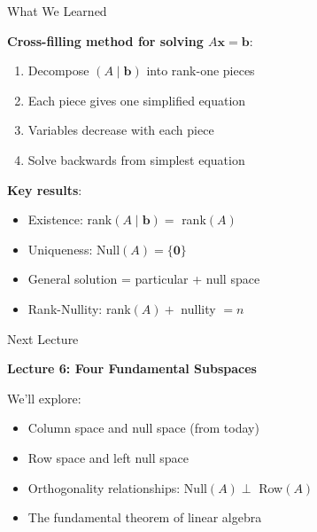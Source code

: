 \documentclass[10pt]{beamer}
\theoremstyle{definition}
\newcommand{\x}[1]{\alert{\textbf{#1}}}
\begin{document}
\begin{frame}{What We Learned}

\x{Cross-filling method for solving $A\mathbf{x} = \mathbf{b}$}:
\begin{enumerate}
\item Decompose $(A \mid \mathbf{b})$ into rank-one pieces
\item Each piece gives one simplified equation
\item Variables decrease with each piece
\item Solve backwards from simplest equation
\end{enumerate}

\vspace{1em}

\x{Key results}:
\begin{itemize}
\item Existence: rank$(A \mid \mathbf{b}) = $ rank$(A)$
\item Uniqueness: Null$(A) = \{\mathbf{0}\}$
\item General solution = particular + null space
\item Rank-Nullity: rank$(A) + $ nullity $ = n$
\end{itemize}

\end{frame}

\begin{frame}{Next Lecture}

\x{Lecture 6: Four Fundamental Subspaces}

\vspace{1em}

We'll explore:
\begin{itemize}
\item Column space and null space (from today)
\item Row space and left null space
\item Orthogonality relationships: Null$(A) \perp $ Row$(A)$
\item The fundamental theorem of linear algebra
\end{itemize}

\end{frame}
\end{document}
